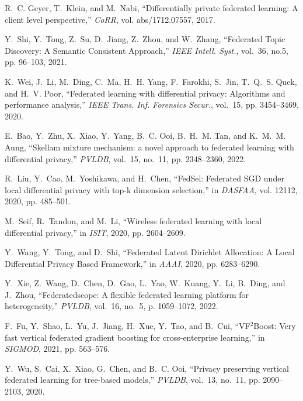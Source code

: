 \documentclass[11pt]{article}
\begin{document}
\begin{thebibliography}{10}
R.~C. Geyer, T.~Klein, and M.~Nabi, ``Differentially private federated
  learning: {A} client level perspective,'' \emph{CoRR}, vol. abs/1712.07557,
  2017.

Y.~Shi, Y.~Tong, Z.~Su, D.~Jiang, Z.~Zhou, and W.~Zhang, ``Federated Topic Discovery: {A} Semantic Consistent Approach,'' \emph{{IEEE} Intell. Syst.}, vol.~36, no.5, pp. 96--103, 2021.


K.~Wei, J.~Li, M.~Ding, C.~Ma, H.~H. Yang, F.~Farokhi, S.~Jin, T.~Q.~S. Quek,
  and H.~V. Poor, ``Federated learning with differential privacy: Algorithms
  and performance analysis,'' \emph{{IEEE} Trans. Inf. Forensics Secur.},
  vol.~15, pp. 3454--3469, 2020.

E.~Bao, Y.~Zhu, X.~Xiao, Y.~Yang, B.~C. Ooi, B.~H.~M. Tan, and K.~M.~M. Aung,
  ``Skellam mixture mechanism: a novel approach to federated learning with
  differential privacy,'' \emph{{PVLDB}}, vol.~15, no.~11, pp. 2348--2360,
  2022.

R.~Liu, Y.~Cao, M.~Yoshikawa, and H.~Chen, ``{FedSel}: Federated {SGD} under
  local differential privacy with top-k dimension selection,'' in
  \emph{{DASFAA}}, vol. 12112, 2020, pp. 485--501.

M.~Seif, R.~Tandon, and M.~Li, ``Wireless federated learning with local
  differential privacy,'' in \emph{{ISIT}}, 2020, pp. 2604--2609.

Y.~Wang, Y.~Tong, and D.~Shi, ``Federated Latent Dirichlet Allocation: {A} Local Differential Privacy
                  Based Framework,'' in \emph{{AAAI}}, 2020, pp. 6283--6290.

Y.~Xie, Z.~Wang, D.~Chen, D.~Gao, L.~Yao, W.~Kuang, Y.~Li, B.~Ding, and
  J.~Zhou, ``{Federatedscope}: A flexible federated learning platform for
  heterogeneity,'' \emph{{PVLDB}}, vol.~16, no.~5, p. 1059–1072, 2022.

F.~Fu, Y.~Shao, L.~Yu, J.~Jiang, H.~Xue, Y.~Tao, and B.~Cui,
  ``{VF}\({}^{\mbox{2}}\){Boost}: Very fast vertical federated gradient
  boosting for cross-enterprise learning,'' in \emph{{SIGMOD}}, 2021, pp.
  563--576.

Y.~Wu, S.~Cai, X.~Xiao, G.~Chen, and B.~C. Ooi, ``Privacy preserving vertical
  federated learning for tree-based models,'' \emph{{PVLDB}}, vol.~13, no.~11,
  pp. 2090--2103, 2020.


\end{thebibliography}
\end{document}
